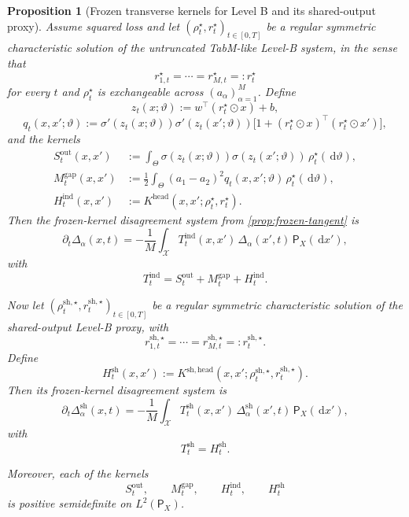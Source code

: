 \documentclass[11pt]{article}
\newtheorem{proposition}[theorem]{Proposition}
\theoremstyle{definition}
\newcommand{\dd}{\,\mathrm{d}}
\begin{document}
\begin{proposition}[Frozen transverse kernels for Level B and its shared-output proxy]
\label{prop:levelb-transverse}
Assume squared loss and let $(\rho_t^\star,r_t^\star)_{t\in[0,T]}$ be a regular symmetric characteristic solution of the untruncated TabM-like Level-B system, in the sense that
\[
  r_{1,t}^\star=\cdots=r_{M,t}^\star=:r_t^\star
\]
for every $t$ and $\rho_t^\star$ is exchangeable across $(a_\alpha)_{\alpha=1}^M$.
Define
\[
  z_t(x;\vartheta):=w^\top(r_t^\star\odot x)+b,
\]
\[
  q_t(x,x';\vartheta)
  :=
  \sigma'(z_t(x;\vartheta))
  \sigma'(z_t(x';\vartheta))
  \bigl[
    1+(r_t^\star\odot x)^\top(r_t^\star\odot x')
  \bigr],
\]
and the kernels
\begin{align}
  S_t^{\mathrm{out}}(x,x')
  &:=
  \int_\Theta
  \sigma(z_t(x;\vartheta))
  \sigma(z_t(x';\vartheta))
  \,\rho_t^\star(\dd \vartheta),
  \label{eq:levelb-transverse-sout}
  \\
  M_t^{\mathrm{gap}}(x,x')
  &:=
  \frac12
  \int_\Theta
  (a_1-a_2)^2
  q_t(x,x';\vartheta)
  \,\rho_t^\star(\dd \vartheta),
  \label{eq:levelb-transverse-mgap}
  \\
  H_t^{\mathrm{ind}}(x,x')
  &:=
  K^{\mathrm{head}}(x,x';\rho_t^\star,r_t^\star).
  \label{eq:levelb-transverse-hind}
\end{align}
Then the frozen-kernel disagreement system from \cref{prop:frozen-tangent} is
\begin{equation}
  \partial_t \Delta_\alpha(x,t)
  =
  -
  \frac1M
  \int_{\mathcal X}
  T_t^{\mathrm{ind}}(x,x')\,
  \Delta_\alpha(x',t)\,
  \mathsf P_X(\dd x'),
  \label{eq:levelb-transverse-ind}
\end{equation}
with
\begin{equation}
  T_t^{\mathrm{ind}}
  =
  S_t^{\mathrm{out}}
  +
  M_t^{\mathrm{gap}}
  +
  H_t^{\mathrm{ind}}.
  \label{eq:levelb-transverse-ind-kernel}
\end{equation}

Now let $(\rho_t^{\mathrm{sh},\star},r_t^{\mathrm{sh},\star})_{t\in[0,T]}$ be a regular symmetric characteristic solution of the shared-output Level-B proxy, with
\[
  r_{1,t}^{\mathrm{sh},\star}=\cdots=r_{M,t}^{\mathrm{sh},\star}=:r_t^{\mathrm{sh},\star}.
\]
Define
\[
  H_t^{\mathrm{sh}}(x,x')
  :=
  K^{\mathrm{sh,head}}(x,x';\rho_t^{\mathrm{sh},\star},r_t^{\mathrm{sh},\star}).
\]
Then its frozen-kernel disagreement system is
\begin{equation}
  \partial_t \Delta_\alpha^{\mathrm{sh}}(x,t)
  =
  -
  \frac1M
  \int_{\mathcal X}
  T_t^{\mathrm{sh}}(x,x')\,
  \Delta_\alpha^{\mathrm{sh}}(x',t)\,
  \mathsf P_X(\dd x'),
  \label{eq:levelb-transverse-sh}
\end{equation}
with
\begin{equation}
  T_t^{\mathrm{sh}}=H_t^{\mathrm{sh}}.
  \label{eq:levelb-transverse-sh-kernel}
\end{equation}

Moreover, each of the kernels
\[
  S_t^{\mathrm{out}},
  \qquad
  M_t^{\mathrm{gap}},
  \qquad
  H_t^{\mathrm{ind}},
  \qquad
  H_t^{\mathrm{sh}}
\]
is positive semidefinite on $L^2(\mathsf P_X)$.
\end{proposition}
\end{document}
